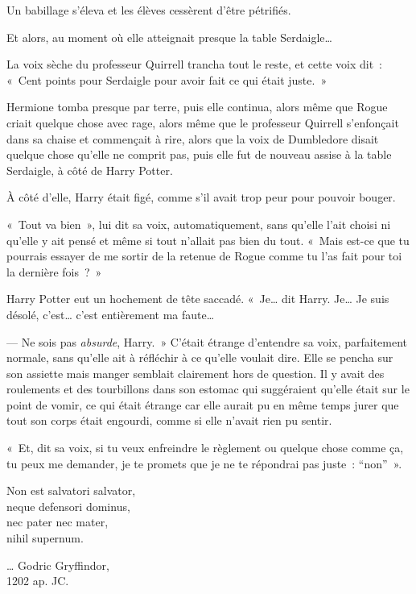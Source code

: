 Un babillage s'éleva et les élèves cessèrent d'être pétrifiés.

Et alors, au moment où elle atteignait presque la table Serdaigle…

La voix sèche du professeur Quirrell trancha tout le reste, et cette voix dit~: «~Cent points pour Serdaigle pour avoir fait ce qui était juste.~»

Hermione tomba presque par terre, puis elle continua, alors même que Rogue criait quelque chose avec rage, alors même que le professeur Quirrell s'enfonçait dans sa chaise et commençait à rire, alors que la voix de Dumbledore disait quelque chose qu'elle ne comprit pas, puis elle fut de nouveau assise à la table Serdaigle, à côté de Harry Potter.

À côté d'elle, Harry était figé, comme s'il avait trop peur pour pouvoir bouger.

«~Tout va bien~», lui dit sa voix, automatiquement, sans qu'elle l'ait choisi ni qu'elle y ait pensé et même si tout n'allait pas bien du tout.
«~Mais est-ce que tu pourrais essayer de me sortir de la retenue de Rogue comme tu l'as fait pour toi la dernière fois~?~»

Harry Potter eut un hochement de tête saccadé.
«~Je… dit Harry.
Je… Je suis désolé, c'est… c'est entièrement ma faute…

--- Ne sois pas \emph{absurde}, Harry.~»
C'était étrange d'entendre sa voix, parfaitement normale, sans qu'elle ait à réfléchir à ce qu'elle voulait dire.
Elle se pencha sur son assiette mais manger semblait clairement hors de question.
Il y avait des roulements et des tourbillons dans son estomac qui suggéraient qu'elle était sur le point de vomir, ce qui était étrange car elle aurait pu en même temps jurer que tout son corps était engourdi, comme si elle n'avait rien pu sentir.

«~Et, dit sa voix, si tu veux enfreindre le règlement ou quelque chose comme ça, tu peux me demander, je te promets que je ne te répondrai pas juste~: “non”~».
\later

\begin{center}
Non est salvatori salvator,\\
neque defensori dominus,\\
nec pater nec mater,\\
nihil supernum.

… Godric Gryffindor,\\
1202 ap. JC.
\end{center}

